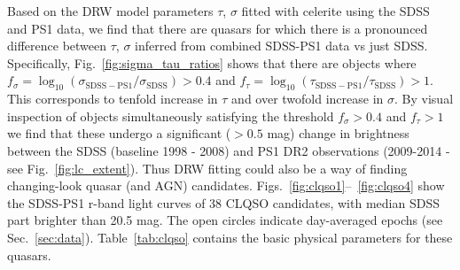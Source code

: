 \documentclass[twocolumn]{aastex62}
\newcommand{\project}[1]{\textsf{#1}}
\begin{document}
Based on the DRW model  parameters $\tau$, $\sigma$ fitted with \project{celerite} using the SDSS and PS1 data, we find that there are quasars for which there is a pronounced difference between $\tau$, $\sigma$  inferred from combined SDSS-PS1 data vs just SDSS. Specifically, Fig.~\ref{fig:sigma_tau_ratios} shows that there are objects where 
$f_{\sigma} = \log_{10}{\left( \sigma_{\mathrm{SDSS-PS1}} / \sigma_{\mathrm{SDSS}} \right)} > 0.4 $ and 
 $f_{\tau} = \log_{10}{\left( \tau_{\mathrm{SDSS-PS1}} / \tau_{\mathrm{SDSS}} \right)} > 1  $.  This corresponds to tenfold increase in $\tau$ and over twofold increase in $\sigma$. By visual inspection of objects simultaneously satisfying the threshold $f_{\sigma}> 0.4$ and $f_{\tau}> 1 $ we find that these undergo a significant ($>0.5$ mag) change in brightness between the SDSS (baseline 1998 - 2008) and PS1 DR2 observations (2009-2014 - see Fig.~\ref{fig:lc_extent}). Thus DRW fitting could also be a way of finding changing-look quasar (and AGN) candidates. Figs.~\ref{fig:clqso1}--~\ref{fig:clqso4} show the SDSS-PS1 r-band light curves of 38 CLQSO candidates, with median SDSS part brighter than 20.5 mag. The open circles indicate day-averaged epochs (see Sec.~\ref{sec:data}). Table~\ref{tab:clqso} contains the basic physical parameters for these quasars. 

\begin{figure*} %
\caption{Outliers in the space of recovered DRW parameters between SDSS and SDSS-PS1, as well as median offsets. Page 1.}
\label{fig:clqso1}
\end{figure*}

\begin{figure*}
\caption{As Fig.~\ref{fig:clqso1}, page 2. }
\label{fig:clqso2}
\end{figure*}


\begin{figure*}
\caption{As Fig.~\ref{fig:clqso1}, page 3. }
\label{fig:clqso3}
\end{figure*}

\begin{figure*}
\caption{As Fig.~\ref{fig:clqso1}, page 4. }
\label{fig:clqso4}
\end{figure*}
\end{document}
